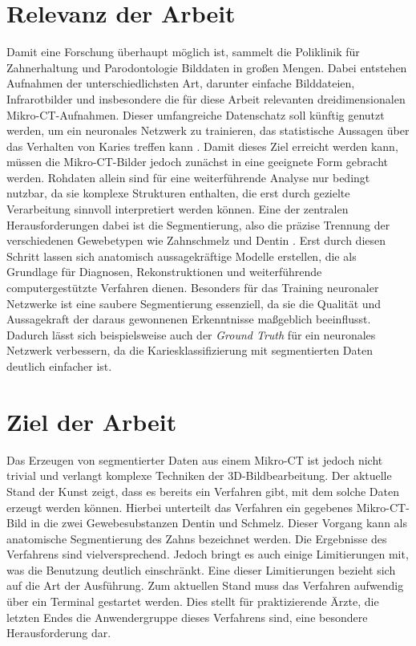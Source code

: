 \section{Relevanz der Arbeit}
\label{sec:relevanz_der_arbeit} Damit eine Forschung überhaupt möglich ist, sammelt
die Poliklinik für Zahnerhaltung und Parodontologie Bilddaten in großen Mengen.
Dabei entstehen Aufnahmen der unterschiedlichsten Art, darunter einfache Bilddateien,
Infrarotbilder und insbesondere die für diese Arbeit relevanten
dreidimensionalen Mikro-\ac{CT}-Aufnahmen. Dieser umfangreiche Datenschatz soll
künftig genutzt werden, um ein neuronales Netzwerk zu trainieren, das
statistische Aussagen über das Verhalten von Karies treffen kann \citep[vgl.][S.~1]{walter2025projekt}.
Damit dieses Ziel erreicht werden kann, müssen die Mikro-\ac{CT}-Bilder jedoch
zunächst in eine geeignete Form gebracht werden. Rohdaten allein sind für eine weiterführende
Analyse nur bedingt nutzbar, da sie komplexe Strukturen enthalten, die erst durch
gezielte Verarbeitung sinnvoll interpretiert werden können. Eine der zentralen
Herausforderungen dabei ist die Segmentierung, also die präzise Trennung der verschiedenen
Gewebetypen wie Zahnschmelz und Dentin \citep[vgl.][S.~359]{lehmann2013bildverarbeitung}.
Erst durch diesen Schritt lassen sich anatomisch aussagekräftige Modelle erstellen,
die als Grundlage für Diagnosen, Rekonstruktionen und weiterführende computergestützte
Verfahren dienen. Besonders für das Training neuronaler Netzwerke ist eine
saubere Segmentierung essenziell, da sie die Qualität und Aussagekraft der daraus
gewonnenen Erkenntnisse maßgeblich beeinflusst. Dadurch lässt sich
beispielsweise auch der \textit{Ground Truth} für ein neuronales Netzwerk verbessern,
da die Kariesklassifizierung mit segmentierten Daten deutlich einfacher ist.

\section{Ziel der Arbeit}
\label{sec:ziel_der_arbeit} Das Erzeugen von segmentierter Daten aus einem Mikro-\ac{CT}
ist jedoch nicht trivial und verlangt komplexe Techniken der \ac{3D}-Bildbearbeitung.
Der aktuelle Stand der Kunst zeigt, dass es bereits ein Verfahren gibt, mit dem
solche Daten erzeugt werden können. Hierbei unterteilt das Verfahren ein gegebenes
Mikro-\ac{CT}-Bild in die zwei Gewebesubstanzen Dentin und Schmelz. Dieser Vorgang
kann als anatomische Segmentierung des Zahns bezeichnet werden. Die Ergebnisse
des Verfahrens sind vielversprechend. Jedoch bringt es auch einige Limitierungen
mit, was die Benutzung deutlich einschränkt. Eine dieser Limitierungen bezieht sich
auf die Art der Ausführung. Zum aktuellen Stand muss das Verfahren aufwendig
über ein Terminal gestartet werden. Dies stellt für praktizierende Ärzte, die
letzten Endes die Anwendergruppe dieses Verfahrens sind, eine besondere Herausforderung
dar.

